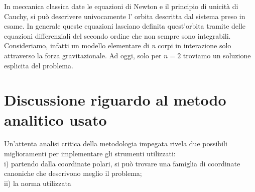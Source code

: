 In meccanica classica date le equazioni di Newton e il principio di unicità di Cauchy, si può descrivere univocamente l' orbita descritta dal sistema preso in esame.
In generale queste equazioni lasciano definita quest'orbita tramite delle equazioni differenziali del secondo ordine che non sempre sono integrabili.
Consideriamo, infatti un modello elementare di \textit{n} corpi in interazione solo attraverso la forza gravitazionale. Ad oggi, solo per $\textit{n}=2$ troviamo un soluzione esplicita del problema. 




\section { Discussione riguardo al metodo analitico usato }

Un'attenta analisi critica della metodologia impegata rivela due possibili miglioramenti per implementare gli strumenti utilizzati:
\\i) partendo dalla coordinate polari, si può trovare una famiglia di coordinate canoniche che descrivono meglio il problema;
\\ii) la norma utilizzata 


